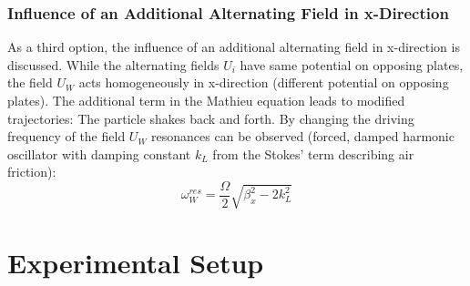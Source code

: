 \documentclass[
	paper=A4,
	parskip=full,
	chapterprefix=true,
	11pt,
	headings=normal,
	bibliography=totoc,
	listof=totoc,
	titlepage=on,
]{scrreprt}
\begin{document}
\subsection{Influence of an Additional Alternating Field in x-Direction}

As a third option, the influence of an additional alternating field in x-direction is discussed. While the alternating fields $U_i$ have same potential on opposing plates, the field $U_W$ acts homogeneously in x-direction (different potential on opposing plates). The additional term in the Mathieu equation leads to modified trajectories: The particle shakes back and forth. By changing the driving frequency of the field $U_W$ resonances can be observed (forced, damped harmonic oscillator with damping constant $k_L$ from the Stokes' term describing air friction):
\begin{equation}
	\omega_W^{res} = \frac{\Omega}{2} \sqrt{\beta_x^2 - 2 k_L^2}
	\label{eq:resonance}
\end{equation}


\chapter{Experimental Setup}
\end{document}
